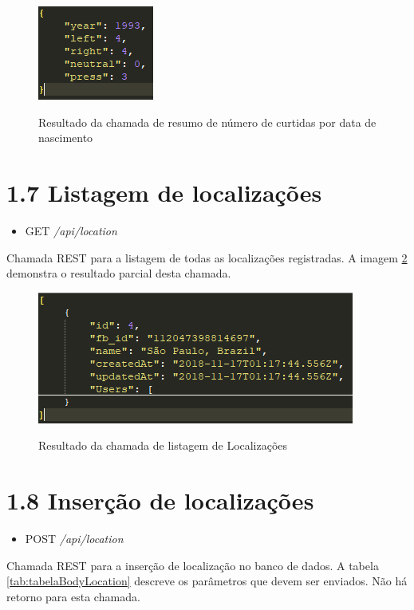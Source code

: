 \documentclass[
	12pt,				%
	oneside,			%
	a4paper,			%
	english,			%
	brazil				%
	]{abntex2ppgsi}
\begin{document}
\begin{apendicesenv}
\begin{figure}[H]
	\centering
	\caption{Resultado da chamada de resumo de número de curtidas por data de nascimento}
	\includegraphics[scale=1]{resultadoBirthdayLikeSummary.png}
	\label{fig:retornoBirthdayLikeSummary}
\end{figure}

\section*{1.7 Listagem de localizações}

\begin{itemize}
	\item {GET} \textit{/api/location}
\end{itemize}

Chamada REST para a listagem de todas as localizações registradas. A imagem \ref{fig:retornoLocation} demonstra o resultado parcial desta chamada.

\begin{figure}[H]
	\centering
	\caption{Resultado da chamada de listagem de Localizações}
	\includegraphics[scale=1]{resultadoLocation.png}
	\label{fig:retornoLocation}
\end{figure}


\section*{1.8 Inserção de localizações}

\begin{itemize}
	\item {POST} \textit{/api/location}
\end{itemize}

Chamada REST para a inserção de localização no banco de dados. A tabela \ref{tab:tabelaBodyLocation} descreve os parâmetros que devem ser enviados. Não há retorno para esta chamada.


\end{apendicesenv}
\end{document}
